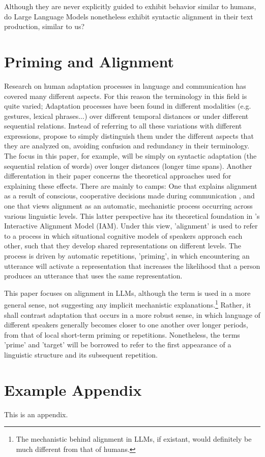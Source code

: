 \documentclass[11pt]{article}
\begin{document}
Although they are never explicitly guided to exhibit behavior similar to humans, do Large Language Models nonetheless exhibit syntactic alignment in their text production, similar to us?

\section{Priming and Alignment}
Research on human adaptation processes in language and communication has covered many different aspects. For this reason the terminology in this field is quite varied; Adaptation processes have been found in different modalities (e.g. gestures, lexical phrases...) over different temporal distances or under different sequential relations.
Instead of referring to all these variations with different expressions, \citealp{Rasenberg2020framework} propose to simply distinguish them under the different aspects that they are analyzed on, avoiding confusion and redundancy in their terminology. The focus in this paper, for example, will be simply on syntactic adaptation (the sequential relation of words) over longer distances (longer time spans). Another differentation in their paper concerns the theoretical approaches used for explaining these effects. There are mainly to camps: One that explains alignment as a result of conscious, cooperative decisions made during communication \cite{brennan1996conceptual_pacts}, and one that views alignment as an automatic, mechanistic process occurring across various linguistic levels. This latter perspective has its theoretical foundation in \citealp{Pickering_Garrod_2004}'s Interactive Alignment Model (IAM). Under this view, 'alignment' is used to refer to a process in which situational cognitive models of speakers approach each other, such that they develop shared representations on different levels. The process is driven by automatic repetitions, 'priming', in which encountering an utterance will activate a representation that increases the likelihood that a person produces an utterance that uses the same representation.

This paper focuses on alignment in LLMs, although the term is used in a more general sense, not suggesting any implicit mechanistic explanations.\footnote{The mechanistic behind alignment in LLMs, if existant, would definitely be much different from that of humans.} Rather, it shall contrast adaptation that occurs in a more robust sense, in which language of different speakers generally becomes closer to one another over longer periods, from that of local short-term priming or repetitions.
Nonetheless, the terms 'prime' and 'target' will be borrowed to refer to the first appearance of a linguistic structure and its subsequent repetition.

%


\appendix

\section{Example Appendix}
\label{sec:appendix}

This is an appendix.
\end{document}
